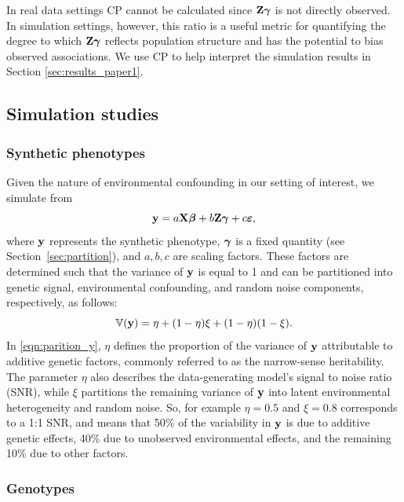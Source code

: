 In real data settings CP cannot be calculated since $\mathbf{Z} \boldsymbol{\gamma}$ is not directly observed. In simulation settings, however, this ratio is a useful metric for quantifying the degree to which $\mathbf{Z} \boldsymbol{\gamma}$ reflects population structure and has the potential to bias observed associations. We use CP to help interpret the simulation results in Section \ref{sec:results_paper1}. %

\subsection{Simulation studies}

\subsubsection{Synthetic phenotypes}

Given the nature of environmental confounding in our setting of interest, we simulate from
\begin{equation}
    \label{eqn:sim}
    \mathbf{y} = a \mathbf{X} \boldsymbol{\beta}{} + b \mathbf{Z} \boldsymbol{\gamma} + c \boldsymbol{\varepsilon}{},
\end{equation}
where $\mathbf{y}$ represents the synthetic phenotype, $\boldsymbol{\gamma}$ is a fixed quantity (see Section~\ref{sec:partition}), and $a, b, c$ are scaling factors. These factors are determined such that the variance of $\mathbf{y}$ is equal to 1 and can be partitioned into genetic signal, environmental confounding, and random noise components, respectively, as follows:
\begin{equation}
    \label{eqn:parition_y}
    \mathbb{V}(\mathbf{y}) = \eta + (1 - \eta) \xi + (1-\eta)(1-\xi).
\end{equation}
In \eqref{eqn:parition_y}, $\eta$ defines the proportion of the variance of $\mathbf{y}$ attributable to additive genetic factors, commonly referred to as the narrow-sense heritability. %
The parameter $\eta$ also describes the data-generating model's signal to noise ratio (SNR), while $\xi$ partitions the remaining variance of $\mathbf{y}$ into latent environmental heterogeneity and random noise. So, for example $\eta = 0.5$ and $\xi = 0.8$ corresponds to a 1:1 SNR, and means that 50\% of the variability in $\mathbf{y}$ is due to additive genetic effects, 40\% due to unobserved environmental effects, and the remaining 10\% due to other factors.

\subsubsection{Genotypes}
\label{sec:subpopulation_structure}

